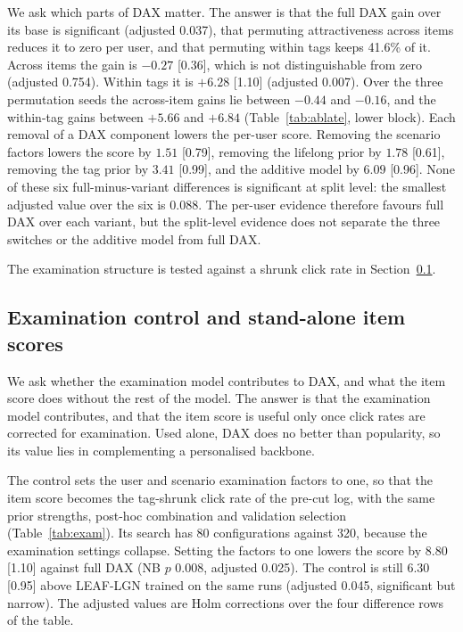 We ask which parts of DAX matter. The answer is that the full DAX gain over its base is significant (adjusted 0.037), that permuting attractiveness across items reduces it to zero per user, and that permuting within tags keeps 41.6\% of it. Across items the gain is $-0.27$ [0.36], which is not distinguishable from zero (adjusted
0.754). Within tags it is $+6.28$ [1.10] (adjusted 0.007). Over the three permutation seeds the across-item gains lie between $-0.44$ and $-0.16$, and the
within-tag gains between $+5.66$ and $+6.84$ (Table~\ref{tab:ablate}, lower block). Each removal of a DAX component lowers the per-user score. Removing the scenario factors lowers the score by $1.51$ [0.79], removing the lifelong prior by $1.78$ [0.61], removing the tag prior by $3.41$ [0.99], and the additive model by $6.09$ [0.96]. None of these six full-minus-variant differences is significant at split level: the smallest adjusted value over the six is 0.088.
The per-user evidence therefore favours full DAX over each variant, but the split-level evidence does not separate the three switches or the additive
model from full DAX.



The examination structure is tested against a shrunk click rate in Section~\ref{sec:res-exam}.

\subsection{Examination control and stand-alone item scores}
\label{sec:res-exam}

We ask whether the examination model contributes to DAX, and what the item score does without the rest of the model. The answer is that
the examination model contributes, and that the item score is useful only once click rates are corrected for examination. Used alone, DAX
does no better than popularity, so its value lies in complementing a personalised backbone.

The control sets the user and scenario examination factors to one, so that the item score becomes the tag-shrunk click rate of the pre-cut
log, with the same prior strengths, post-hoc combination and validation selection (Table~\ref{tab:exam}). Its search has 80 configurations
against 320, because the examination settings collapse. Setting the factors to one lowers the score by $8.80$ [1.10] against full DAX (NB
$p$ 0.008, adjusted 0.025). The control is still $6.30$ [0.95] above LEAF-LGN trained on the same runs (adjusted 0.045, significant but
narrow). The adjusted values are Holm corrections over the four difference rows of the table.

